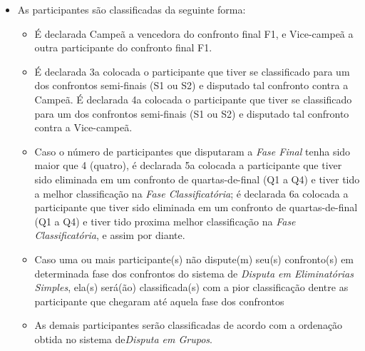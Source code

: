 \begin{itemize}[noitemsep]
	\item As participantes são classificadas da seguinte forma:
	\begin{itemize}[noitemsep]
		\item É declarada Campeã a vencedora do confronto final F1, e Vice-campeã a outra participante do confronto final F1.
		\item É declarada 3a colocada o participante que tiver se classificado para um dos confrontos semi-finais (S1 ou S2) e disputado tal confronto contra a Campeã. É declarada 4a colocada o participante que tiver se classificado para um dos confrontos semi-finais (S1 ou S2) e disputado tal confronto contra a Vice-campeã.
		\item Caso o número de participantes que disputaram a \textit{Fase Final} tenha sido maior que 4 (quatro), é declarada 5a colocada a participante que tiver sido eliminada em um confronto de quartas-de-final (Q1 a Q4) e tiver tido a melhor classificação na \textit{Fase Classificatória}; é declarada 6a colocada a participante que tiver sido eliminada em um confronto de quartas-de-final (Q1 a Q4) e tiver tido proxima melhor classificação na \textit{Fase Classificatória}, e assim por diante.
		\item Caso uma ou mais participante(s) não dispute(m) seu(s) confronto(s) em determinada fase dos confrontos do sistema de \textit{Disputa em Eliminatórias Simples}, ela(s) será(ão) classificada(s) com a pior classificação dentre as participante que chegaram até aquela fase dos confrontos
		\item As demais participantes serão classificadas de acordo com a ordenação obtida no sistema de\textit {Disputa em Grupos}.
	\end{itemize}
\end{itemize}

